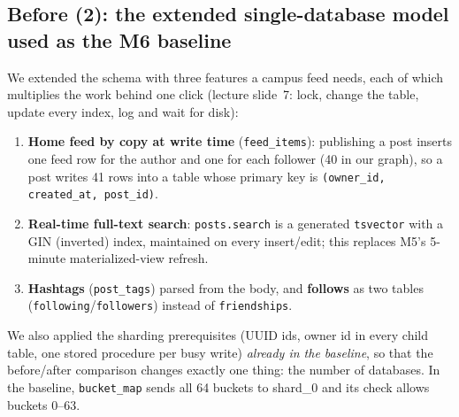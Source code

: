 \subsection{Before (2): the extended single-database model used as the M6 baseline}\label{sec:extension}
We extended the schema with three features a campus feed needs, each of which multiplies the work
behind one click (lecture slide~7: lock, change the table, update every index, log and wait for disk):
\begin{enumerate}[nosep,leftmargin=1.4em]
\item \textbf{Home feed by copy at write time} (\texttt{feed\_items}): publishing a post inserts one
      feed row for the author and one for each follower (40 in our graph), so a post writes 41 rows into a table
      whose primary key is \texttt{(owner\_id, created\_at, post\_id)}.
\item \textbf{Real-time full-text search}: \texttt{posts.search} is a generated \texttt{tsvector} with a GIN
      (inverted) index, maintained on every insert/edit; this replaces M5's 5-minute materialized-view refresh.
\item \textbf{Hashtags} (\texttt{post\_tags}) parsed from the body, and \textbf{follows} as two tables
      (\texttt{following}/\texttt{followers}) instead of \texttt{friendships}.
\end{enumerate}
We also applied the sharding prerequisites (UUID ids, owner id in every child table, one stored
procedure per busy write) \emph{already in the baseline}, so that the before/after comparison changes
exactly one thing: the number of databases. In the baseline, \texttt{bucket\_map} sends all 64 buckets to
shard\_0 and its check allows buckets 0--63.

